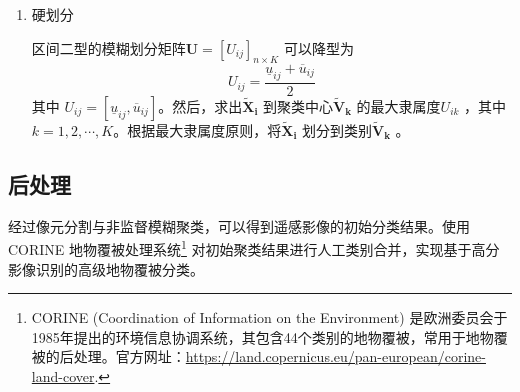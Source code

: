 \begin{enumerate}[(1)]
    \item 硬划分

          区间二型的模糊划分矩阵$\bm{U} = [U_{ij}]_{n \times K}$ 可以降型为
          \begin{equation}\label{eq:21}
              U_{ij} = \frac{\underline{u}_{ij} + \overline{u}_{ij}}{2}
          \end{equation}
          其中 $U_{ij} = [\underline{u}_{ij}, \overline{u}_{ij}]$。然后，求出$\bm{\tilde{X}_i}$ 到聚类中心$\bm{\tilde{V}_k}$ 的最大隶属度$U_{ik}$ ，其中$k = 1, 2,\cdots, K$。根据最大隶属度原则，将$\bm{\tilde{X}_i}$ 划分到类别$\bm{\tilde{V}_k}$ 。



\end{enumerate}


\subsection{后处理}
\label{subsec::chap03-3-3}

经过像元分割与非监督模糊聚类，可以得到遥感影像的初始分类结果。使用CORINE 地物覆被处理系统\footnote{CORINE (Coordination of Information on the Environment) 是欧洲委员会于1985年提出的环境信息协调系统，其包含44个类别的地物覆被，常用于地物覆被的后处理。官方网址：\url{https://land.copernicus.eu/pan-european/corine-land-cover}.} 对初始聚类结果进行人工类别合并，实现基于高分影像识别的高级地物覆被分类\cite{zhang2011progress}。

